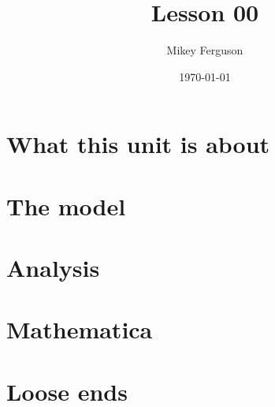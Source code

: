 \documentclass[11pt]{article}
\title{Lesson 00}
\author{Mikey Ferguson}
\date{\today}
\begin{document}
\maketitle
\tableofcontents
\bigskip

\section{What this unit is about}

\section{The model}

\section{Analysis}

\section{Mathematica}

\section{Loose ends}
\end{document}
